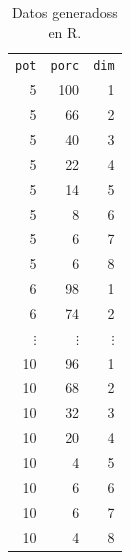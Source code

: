 \documentclass{article}
\begin{document}
\begin{table}
 \caption{Datos generadoss en R.}
 \label{t1}
 \begin{center}
 \begin{tabular}{rrr}
\texttt{pot} & \texttt{porc} & \texttt{dim} \\

5  &  100  &  1  \\
5  &  66  &  2  \\
5  &  40  &  3  \\
5  &  22  &  4  \\
5  &  14  &  5  \\
5  &  8  &  6  \\
5  &  6  &  7  \\
5  &  6  &  8  \\
6  &  98  &  1  \\
6  &  74  &  2  \\
$\vdots$ &   $\vdots$ &   $\vdots$ \\    
10  &  96  &  1  \\
10  &  68  &  2  \\
10  &  32  &  3  \\
10  &  20  &  4  \\
10  &  4  &  5  \\
10  &  6  &  6  \\
10  &  6  &  7  \\
10  &  4  &  8  \\
\end{tabular}
\end{center}
\end{table}
\end{document}
